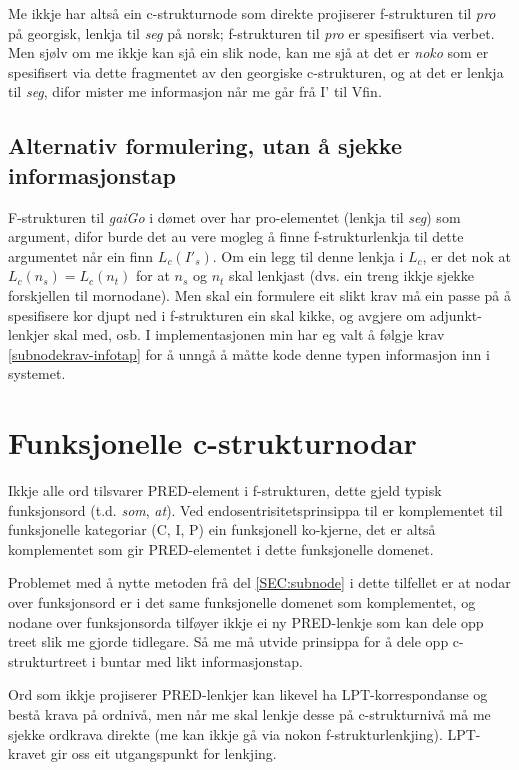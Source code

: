 \documentclass[11pt,a4paper,oneside,draft]{book}
\begin{document}
Me ikkje har altså ein c-strukturnode som direkte projiserer
f-strukturen til \emph{pro} på georgisk, lenkja til \emph{seg} på norsk;
f-strukturen til \emph{pro} er spesifisert via verbet. Men sjølv om me
ikkje kan sjå ein slik node, kan me sjå at det er \emph{noko} som er
spesifisert via dette fragmentet av den georgiske c-strukturen, og at
det er lenkja til \emph{seg}, difor mister me informasjon når me går frå I'
til Vfin.

\subsection{Alternativ formulering, utan å sjekke informasjonstap}
\label{sec-3.7.1}

F-strukturen til \emph{gaiGo} i dømet over har pro-elementet (lenkja til
\emph{seg}) som argument, difor burde det au vere mogleg å finne
f-strukturlenkja til dette argumentet når ein finn $L_c(I'_s)$. Om ein
legg til denne lenkja i $L_c$, er det nok at $L_c(n_s)=L_c(n_t)$ for
at $n_s$ og $n_t$ skal lenkjast (dvs. ein treng ikkje sjekke
forskjellen til mornodane). Men skal ein formulere eit slikt krav må
ein passe på å spesifisere kor djupt ned i f-strukturen ein skal
kikke, og avgjere om adjunkt-lenkjer skal med, osb. I implementasjonen
min har eg valt å følgje krav \ref{subnodekrav-infotap} for å unngå å
måtte kode denne typen informasjon inn i systemet.

\section{Funksjonelle c-strukturnodar}
\label{sec-3.8}

\label{SEC:fnord}

Ikkje alle ord tilsvarer PRED-element i f-strukturen, dette gjeld
typisk funksjonsord (t.d. \emph{som}, \emph{at}). Ved endosentrisitetsprinsippa
til \citet{bresnan2001lfs} er komplementet til funksjonelle kategoriar
(C, I, P) ein funksjonell ko-kjerne, det er altså komplementet som gir
PRED-elementet i dette funksjonelle domenet.

Problemet med å nytte metoden frå del \ref{SEC:subnode} i dette
tilfellet er at nodar over funksjonsord er i det same funksjonelle
domenet som komplementet, og nodane over funksjonsorda tilføyer ikkje
ei ny PRED-lenkje som kan dele opp treet slik me gjorde tidlegare. Så
me må utvide prinsippa for å dele opp c-strukturtreet i buntar med
likt informasjonstap.

Ord som ikkje projiserer PRED-lenkjer kan likevel ha
LPT-korrespondanse og bestå krava på ordnivå, men når me skal lenkje
desse på c-strukturnivå må me sjekke ordkrava direkte (me kan ikkje gå
via nokon f-strukturlenkjing). LPT-kravet gir oss eit utgangspunkt for
lenkjing.
\end{document}
